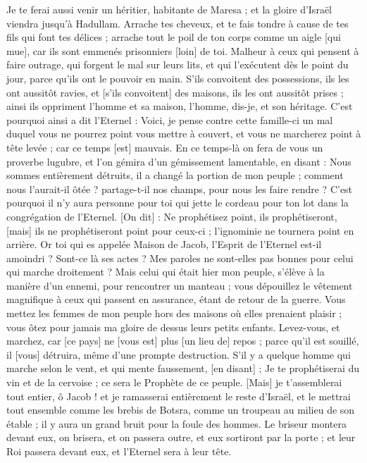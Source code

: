 \begin{multicols}{2}
Je te ferai aussi venir un héritier, habitante de Maresa ; et la gloire d'Israël viendra jusqu'à Hadullam.
Arrache tes cheveux, et te fais tondre à cause de tes fils qui font tes délices ; arrache tout le poil de ton corps comme un aigle [qui mue], car ils sont emmenés prisonniers [loin] de toi.
\VerseOne{}Malheur à ceux qui pensent à faire outrage, qui forgent le mal sur leurs lits, et qui l'exécutent dès le point du jour, parce qu'ils ont le pouvoir en main.
S'ils convoitent des possessions, ils les ont aussitôt ravies, et [s'ils convoitent] des maisons, ils les ont aussitôt prises ; ainsi ils oppriment l'homme et sa maison, l'homme, dis-je, et son héritage.
C'est pourquoi ainsi a dit l'Eternel : Voici, je pense contre cette famille-ci un mal duquel vous ne pourrez point vous mettre à couvert, et vous ne marcherez point à tête levée ; car ce temps [est] mauvais.
En ce temps-là on fera de vous un proverbe lugubre, et l'on gémira d'un gémissement lamentable, en disant : Nous sommes entièrement détruits, il a changé la portion de mon peuple ; comment nous l'aurait-il ôtée ? partage-t-il nos champs, pour nous les faire rendre ?
C'est pourquoi il n'y aura personne pour toi qui jette le cordeau pour ton lot dans la congrégation de l'Eternel.
[On dit] : Ne prophétisez point, ils prophétiseront, [mais] ils ne prophétiseront point pour ceux-ci ; l'ignominie ne tournera point en arrière.
Or toi qui es appelée Maison de Jacob, l'Esprit de l'Eternel est-il amoindri ? Sont-ce là ses actes ? Mes paroles ne sont-elles pas bonnes pour celui qui marche droitement ?
Mais celui qui était hier mon peuple, s'élève à la manière d'un ennemi, pour rencontrer un manteau ; vous dépouillez le vêtement magnifique à ceux qui passent en assurance, étant de retour de la guerre.
Vous mettez les femmes de mon peuple hors des maisons où elles prenaient plaisir ; vous ôtez pour jamais ma gloire de dessus leurs petits enfants.
Levez-vous, et marchez, car [ce pays] ne [vous est] plus [un lieu de] repos ; parce qu'il est souillé, il [vous] détruira, même d'une prompte destruction.
S'il y a quelque homme qui marche selon le vent, et qui mente faussement, [en disant] ; Je te prophétiserai du vin et de la cervoise ; ce sera le Prophète de ce peuple.
[Mais] je t'assemblerai tout entier, ô Jacob ! et je ramasserai entièrement le reste d'Israël, et le mettrai tout ensemble comme les brebis de Botsra, comme un troupeau au milieu de son étable ; il y aura un grand bruit pour la foule des hommes.
Le briseur montera devant eux, on brisera, et on passera outre, et eux sortiront par la porte ; et leur Roi passera devant eux, et l'Eternel sera à leur tête.

\end{multicols}

